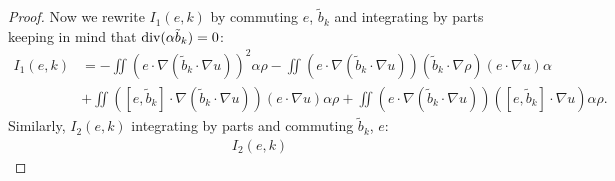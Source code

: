 \documentclass[11pt]{amsart}
\numberwithin{equation}{section}
\begin{document}
\begin{proof}
Now we rewrite $I_1(e,k)$ by commuting $e$, $\tilde b_k$ and integrating by parts keeping in mind that $\textnormal{div}(\alpha\tilde b_k)=0$:
%
% 
\begin{align*}
  I_{1}(e,k) &
  =-\iint\left(e\cdot\nabla\left(\tilde{b}_{k}\cdot\nabla u\right)\right)^{2}\alpha\rho
  -\iint\left(e\cdot\nabla\left(\tilde{b}_{k}\cdot\nabla u\right)\right)\left(\tilde{b}_{k}\cdot\nabla\rho\right)\left(e\cdot\nabla u\right)\alpha\\
  & +\iint\left([e,\tilde{b}_{k}]\cdot\nabla\left(\tilde{b}_{k}\cdot\nabla u\right)\right)\left(e\cdot\nabla u\right)\alpha\rho
  +\iint\left(e\cdot\nabla\left(\tilde{b}_{k}\cdot\nabla u\right)\right)\left([e,\tilde{b}_{k}]\cdot\nabla u\right)\alpha\rho.
\end{align*}
% 
Similarly, $I_2(e,k)$ integrating by parts and commuting $\tilde b_k$, $e$:
%
\begin{align*}
  I_{2}(e,k) 

\end{align*}
\end{proof}
\end{document}
